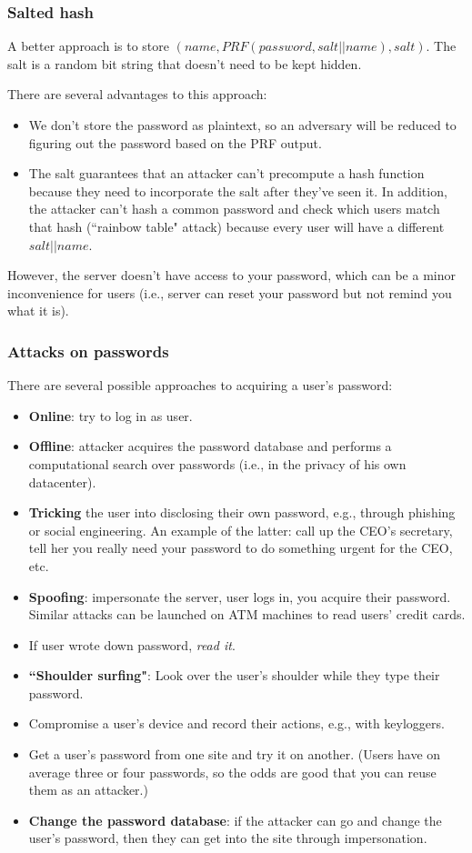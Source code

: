 \documentclass[12pt]{article}
\begin{document}
\subsubsection*{Salted hash}

A better approach is to store $(name, PRF(password, salt||name), salt)$. The salt is a random bit string that doesn't need to be kept hidden.

There are several advantages to this approach:
\begin{itemize}
\item We don't store the password as plaintext, so an adversary will be reduced to figuring out the password based on the PRF output.
\item The salt guarantees that an attacker can't precompute a hash function because they need to incorporate the salt after they've seen it. In addition, the attacker can't hash a common password and check which users match that hash (``rainbow table" attack) because every user will have a different $salt||name$.
\end{itemize}

However, the server doesn't have access to your password, which can be a minor inconvenience for users (i.e., server can reset your password but not remind you what it is).

\subsubsection*{Attacks on passwords}

There are several possible approaches to acquiring a user's password:
\begin{itemize}
\item \textbf{Online}: try to log in as user.
\item \textbf{Offline}: attacker acquires the password database and performs a computational search over passwords (i.e., in the privacy of his own datacenter).
\item \textbf{Tricking} the user into disclosing their own password, e.g., through phishing or social engineering. An example of the latter: call up the CEO's secretary, tell her you really need your password to do something urgent for the CEO, etc.
\item \textbf{Spoofing}: impersonate the server, user logs in, you acquire their password. Similar attacks can be launched on ATM machines to read users' credit cards.
\item If user wrote down password, \textit{read it}.
\item \textbf{``Shoulder surfing"}: Look over the user's shoulder while they type their password.
\item Compromise a user's device and record their actions, e.g., with keyloggers.
\item Get a user's password from one site and try it on another. (Users have on average three or four passwords, so the odds are good that you can reuse them as an attacker.)
\item \textbf{Change the password database}: if the attacker can go and change the user's password, then they can get into the site through impersonation.
\end{itemize}
\end{document}

